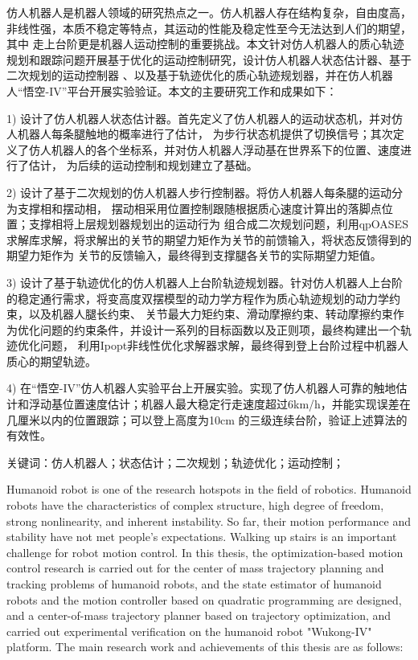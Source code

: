 \cleardoublepage
{}

仿人机器人是机器人领域的研究热点之一。仿人机器人存在结构复杂，自由度高，非线性强，本质不稳定等特点，其运动的性能及稳定性至今无法达到人们的期望，其中
走上台阶更是机器人运动控制的重要挑战。本文针对仿人机器人的质心轨迹规划和跟踪问题开展基于优化的运动控制研究，设计仿人机器人状态估计器、基于二次规划的运动控制器
、以及基于轨迹优化的质心轨迹规划器，并在仿人机器人“悟空-IV”平台开展实验验证。本文的主要研究工作和成果如下：

1) 设计了仿人机器人状态估计器。首先定义了仿人机器人的运动状态机，并对仿人机器人每条腿触地的概率进行了估计，
为步行状态机提供了切换信号；其次定义了仿人机器人的各个坐标系，并对仿人机器人浮动基在世界系下的位置、速度进行了估计，
为后续的运动控制和规划建立了基础。

2) 设计了基于二次规划的仿人机器人步行控制器。将仿人机器人每条腿的运动分为支撑相和摆动相，
摆动相采用位置控制跟随根据质心速度计算出的落脚点位置；支撑相将上层规划器规划出的运动行为
组合成二次规划问题，利用qpOASES求解库求解，将求解出的关节的期望力矩作为关节的前馈输入，将状态反馈得到的期望力矩作为
关节的反馈输入，最终得到支撑腿各关节的实际期望力矩值。

3) 设计了基于轨迹优化的仿人机器人上台阶轨迹规划器。针对仿人机器人上台阶的稳定通行需求，将变高度双摆模型的动力学方程作为质心轨迹规划的动力学约束，以及机器人腿长约束、
关节最大力矩约束、滑动摩擦约束、转动摩擦约束作为优化问题的约束条件，并设计一系列的目标函数以及正则项，最终构建出一个轨迹优化问题，
利用Ipopt非线性优化求解器求解，最终得到登上台阶过程中机器人质心的期望轨迹。

4) 在“悟空-IV”仿人机器人实验平台上开展实验。实现了仿人机器人可靠的触地估计和浮动基位置速度估计；机器人最大稳定行走速度超过6km/h，并能实现误差在几厘米以内的位置跟踪；可以登上高度为10cm
的三级连续台阶，验证上述算法的有效性。

$\textbf{关键词}$：仿人机器人；状态估计；二次规划；轨迹优化；运动控制；

\cleardoublepage
{}

Humanoid robot is one of the research hotspots in the field of robotics. Humanoid robots have the characteristics of complex structure, high degree of freedom, 
strong nonlinearity, and inherent instability. So far, their motion performance and stability have not met people's expectations. 
Walking up stairs is an important challenge for robot motion control. In this thesis, the optimization-based motion control research is carried out 
for the center of mass trajectory planning and tracking problems of humanoid robots, and the state estimator of humanoid robots and the motion controller 
based on quadratic programming are designed, and a center-of-mass trajectory planner based on trajectory optimization, and carried out experimental verification 
on the humanoid robot "Wukong-IV" platform. The main research work and achievements of this thesis are as follows:

